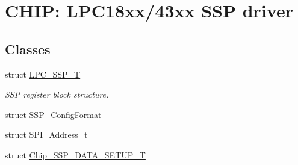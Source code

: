 \hypertarget{group___s_s_p__18_x_x__43_x_x}{}\section{C\+H\+IP\+: L\+P\+C18xx/43xx S\+SP driver}
\label{group___s_s_p__18_x_x__43_x_x}
\subsection*{Classes}
\begin{DoxyCompactItemize}
\item 
struct \hyperlink{struct_l_p_c___s_s_p___t}{L\+P\+C\+\_\+\+S\+S\+P\+\_\+T}
\begin{DoxyCompactList}\small\item\em S\+SP register block structure. \end{DoxyCompactList}\item 
struct \hyperlink{struct_s_s_p___config_format}{S\+S\+P\+\_\+\+Config\+Format}
\item 
struct \hyperlink{struct_s_p_i___address__t}{S\+P\+I\+\_\+\+Address\+\_\+t}
\item 
struct \hyperlink{struct_chip___s_s_p___d_a_t_a___s_e_t_u_p___t}{Chip\+\_\+\+S\+S\+P\+\_\+\+D\+A\+T\+A\+\_\+\+S\+E\+T\+U\+P\+\_\+T}
\end{DoxyCompactItemize}
